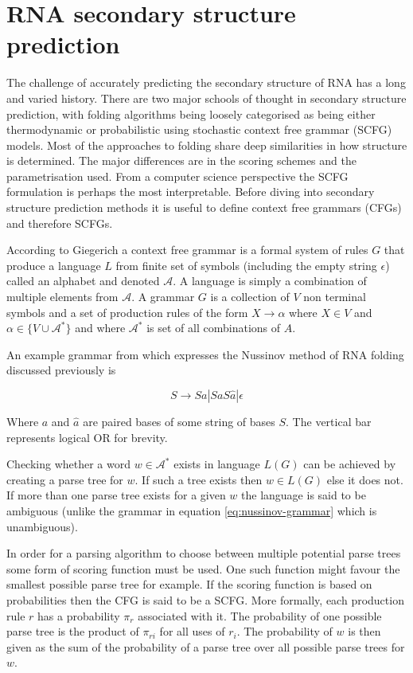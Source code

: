 \documentclass[journal]{IEEEtran}
\begin{document}
\section{RNA secondary structure prediction}
\label{sec:rna-secondary-structure}
The challenge of accurately predicting the secondary structure of RNA has a long and varied history. There are two major schools of thought in secondary structure prediction, with folding algorithms being loosely categorised as being either thermodynamic or probabilistic using stochastic context free grammar (SCFG) models. Most of the approaches to folding share deep similarities in how structure is determined. The major differences are in the scoring schemes and the parametrisation used. From a computer science perspective the SCFG formulation is perhaps the most interpretable. Before diving into secondary structure prediction methods it is useful to define context free grammars (CFGs) and therefore SCFGs. 

According to Giegerich\cite{giegerich2014introduction} a context free grammar is a formal system of rules $G$ that produce a language $L$ from finite set of symbols (including the empty string $\epsilon$) called an alphabet and denoted $\mathcal{A}$. A language is simply a combination of multiple elements from $\mathcal{A}$. A grammar $G$ is a collection of $V$ non terminal symbols and a set of production rules of the form $X \rightarrow \alpha$ where $X \in V$ and $\alpha \in \{V \cup \mathcal{A}^*\}$ and where $\mathcal{A}^*$ is set of all combinations of $A$.

An example grammar from \cite{rivas2013four} which expresses the Nussinov method \cite{nussinov1980fast} of RNA folding discussed previously is

\begin{equation}
	\label{eq:nussinov-grammar}
	S \rightarrow S a | S a S \hat{a} | \epsilon
\end{equation} 

Where $a$ and $\hat{a}$ are paired bases of some string of bases $S$. The vertical bar represents logical OR for brevity.

Checking whether a word $w \in \mathcal{A}^*$ exists in language $L(G)$ can be achieved by creating a parse tree for $w$. If such a tree exists then $w \in L(G)$ else it does not. If more than one parse tree exists for a given $w$ the language is said to be ambiguous (unlike the grammar in equation \ref{eq:nussinov-grammar} which is unambiguous).

In order for a parsing algorithm to choose between multiple potential parse trees some form of scoring function must be used. One such function might favour the smallest possible parse tree for example. If the scoring function is based on probabilities then the CFG is said to be a SCFG. More formally, each production rule $r$ has a probability $\pi_r$ associated with it. The probability of one possible parse tree is the product of $\pi_{ri}$ for all uses of $r_i$. The probability of $w$ is then given as the sum of the probability of a parse tree over all possible parse trees for $w$.
\end{document}
